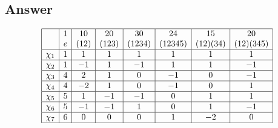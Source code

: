 \documentclass[11pt]{article}
\begin{document}
\subsection{Answer}
\[
\begin{array}{|c|c|c|c|c|c|c|c|}
\hline
&1&10&20&30&24&15&20\\
&e&(12)&(123)&(1234)&(12345)&(12)(34)&(12)(345)\\
\hline
\chi_1&1&1&1&1&1&1&1\\
\hline
\chi_2&1&-1&1&-1&1&1&-1\\
\hline
\chi_3&4&2&1&0&-1&0&-1\\
\hline
\chi_4&4&-2&1&0&-1&0&1\\
\hline
\chi_5&5&1&-1&-1&0&1&1\\
\hline
\chi_6&5&-1&-1&1&0&1&-1\\
\hline
\chi_7&6&0&0&0&1&-2&0\\
\hline
\end{array}\]
\end{document}
